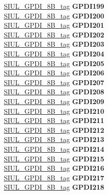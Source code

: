 \begin{DoxyCompactItemize}
\begin{tabbing}
\>\>\mbox{\hyperlink{unionSIUL__GPDI__8B__tag}{SIUL\_GPDI\_8B\_tag}} {\bfseries GPDI199}\\
\>\>\mbox{\hyperlink{unionSIUL__GPDI__8B__tag}{SIUL\_GPDI\_8B\_tag}} {\bfseries GPDI200}\\
\>\>\mbox{\hyperlink{unionSIUL__GPDI__8B__tag}{SIUL\_GPDI\_8B\_tag}} {\bfseries GPDI201}\\
\>\>\mbox{\hyperlink{unionSIUL__GPDI__8B__tag}{SIUL\_GPDI\_8B\_tag}} {\bfseries GPDI202}\\
\>\>\mbox{\hyperlink{unionSIUL__GPDI__8B__tag}{SIUL\_GPDI\_8B\_tag}} {\bfseries GPDI203}\\
\>\>\mbox{\hyperlink{unionSIUL__GPDI__8B__tag}{SIUL\_GPDI\_8B\_tag}} {\bfseries GPDI204}\\
\>\>\mbox{\hyperlink{unionSIUL__GPDI__8B__tag}{SIUL\_GPDI\_8B\_tag}} {\bfseries GPDI205}\\
\>\>\mbox{\hyperlink{unionSIUL__GPDI__8B__tag}{SIUL\_GPDI\_8B\_tag}} {\bfseries GPDI206}\\
\>\>\mbox{\hyperlink{unionSIUL__GPDI__8B__tag}{SIUL\_GPDI\_8B\_tag}} {\bfseries GPDI207}\\
\>\>\mbox{\hyperlink{unionSIUL__GPDI__8B__tag}{SIUL\_GPDI\_8B\_tag}} {\bfseries GPDI208}\\
\>\>\mbox{\hyperlink{unionSIUL__GPDI__8B__tag}{SIUL\_GPDI\_8B\_tag}} {\bfseries GPDI209}\\
\>\>\mbox{\hyperlink{unionSIUL__GPDI__8B__tag}{SIUL\_GPDI\_8B\_tag}} {\bfseries GPDI210}\\
\>\>\mbox{\hyperlink{unionSIUL__GPDI__8B__tag}{SIUL\_GPDI\_8B\_tag}} {\bfseries GPDI211}\\
\>\>\mbox{\hyperlink{unionSIUL__GPDI__8B__tag}{SIUL\_GPDI\_8B\_tag}} {\bfseries GPDI212}\\
\>\>\mbox{\hyperlink{unionSIUL__GPDI__8B__tag}{SIUL\_GPDI\_8B\_tag}} {\bfseries GPDI213}\\
\>\>\mbox{\hyperlink{unionSIUL__GPDI__8B__tag}{SIUL\_GPDI\_8B\_tag}} {\bfseries GPDI214}\\
\>\>\mbox{\hyperlink{unionSIUL__GPDI__8B__tag}{SIUL\_GPDI\_8B\_tag}} {\bfseries GPDI215}\\
\>\>\mbox{\hyperlink{unionSIUL__GPDI__8B__tag}{SIUL\_GPDI\_8B\_tag}} {\bfseries GPDI216}\\
\>\>\mbox{\hyperlink{unionSIUL__GPDI__8B__tag}{SIUL\_GPDI\_8B\_tag}} {\bfseries GPDI217}\\
\>\>\mbox{\hyperlink{unionSIUL__GPDI__8B__tag}{SIUL\_GPDI\_8B\_tag}} {\bfseries GPDI218}\\

\end{tabbing}
\end{DoxyCompactItemize}
